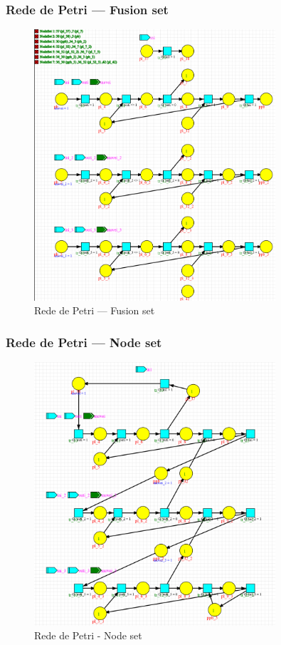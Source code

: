 \subsubsection{Rede de Petri --- Fusion set}
\begin{figure}[H]
    \centering
    \includegraphics[width=0.8\textwidth]{img/petri_model_merge.png}
    \caption{Rede de Petri --- Fusion set}\label{fig:petri_fusion_set}
\end{figure}

\subsubsection{Rede de Petri --- Node set}
\begin{figure}[H]
    \centering
    \includegraphics[width=0.8\textwidth]{img/petri_node_set.png}
    \caption{Rede de Petri - Node set}\label{fig:petri_node_set}
\end{figure}

